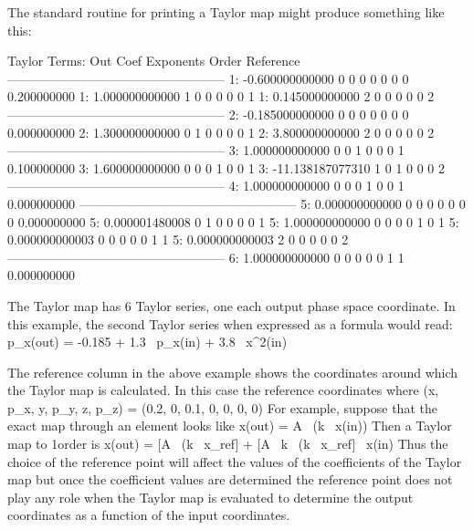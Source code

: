 The standard \bmad routine for printing a Taylor map might produce something 
like this: 
\begin{example}
   Taylor Terms:
    Out     Coef              Exponents           Order        Reference
   ---------------------------------------------------
      1:     -0.600000000000  0  0  0  0  0  0        0       0.200000000
      1:      1.000000000000  1  0  0  0  0  0        1
      1:      0.145000000000  2  0  0  0  0  0        2
   ---------------------------------------------------
      2:     -0.185000000000  0  0  0  0  0  0        0       0.000000000
      2:      1.300000000000  0  1  0  0  0  0        1
      2:      3.800000000000  2  0  0  0  0  0        2
   ---------------------------------------------------
      3:      1.000000000000  0  0  1  0  0  0        1       0.100000000
      3:      1.600000000000  0  0  0  1  0  0        1
      3:    -11.138187077310  1  0  1  0  0  0        2
   ---------------------------------------------------
      4:      1.000000000000  0  0  0  1  0  0        1       0.000000000
   ---------------------------------------------------
      5:      0.000000000000  0  0  0  0  0  0        0       0.000000000
      5:      0.000001480008  0  1  0  0  0  0        1
      5:      1.000000000000  0  0  0  0  1  0        1
      5:      0.000000000003  0  0  0  0  0  1        1
      5:      0.000000000003  2  0  0  0  0  0        2
   ---------------------------------------------------
      6:      1.000000000000  0  0  0  0  0  1        1       0.000000000
\end{example}
The Taylor map has 6 Taylor series, one each output phase space coordinate.
In this example, the second Taylor series when expressed as a formula would
read:
\Begineq
  p_x(out) = -0.185 + 1.3 \, p_x(in) + 3.8 \, x^2(in)
\Endeq

The reference column in the above example shows the coordinates around
which the Taylor map is calculated. In this case the reference
coordinates where 
\Begineq
  (x, p_x, y, p_y, z, p_z) = (0.2, 0, 0.1, 0, 0, 0, 0)
\Endeq
For example, suppose that the exact map through an element looks like
\Begineq
  x(out) = A \, \sin(k \, x(in))
\Endeq
Then a Taylor map to 1\St order is
\Begineq
  x(out) = [A \, \sin(k \, x_{\mbox{ref}}] + 
  [A \, k \, \cos(k \, x_{\mbox{ref}}] \, x(in)
\Endeq
Thus the choice of the reference point will affect the values of the
coefficients of the Taylor map but once the coefficient values are
determined the reference point does not play any role when the Taylor
map is evaluated to determine the output coordinates as a function of
the input coordinates.

